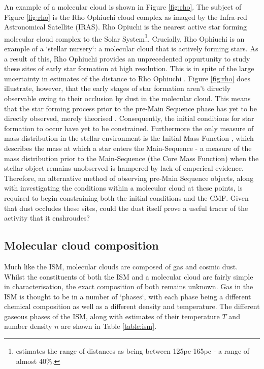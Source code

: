 \documentclass{report}
\begin{document}
An example of a molecular cloud is shown in Figure \ref{fig:rho}. The subject of Figure \ref{fig:rho} is the Rho Ophiuchi cloud complex as imaged by the Infra-red Astronomical Satellite (IRAS). Rho Opiuchi is the nearest active star forming molecular cloud complex to the Solar System\footnote{\textcite{rho-dist} estimates the range of distances as being between 125pc-165pc - a range of almost 40\%.}. Crucially, Rho Ophiuchi is an example of a `stellar nursery`: a molecular cloud that is actively forming stars. As a result of this, Rho Ophiuchi provides an unprecedented oppurtunity to study these sites of early star formation at high resolution. This is in spite of the large uncertainty in estimates of the distance to Rho Ophiuchi \parencite{rho-dist}. Figure \ref{fig:rho} does illustrate, however, that the early stages of star formation aren't directly observable owing to their occlusion by dust in the molecular cloud. This means that the star forming process prior to the pre-Main Sequence phase has yet to be directly observed, merely theorised \parencite{hayashi}. Consequently, the initial conditions for star formation to occur have yet to be constrained. Furthermore the only measure of mass distribution in the stellar environment is the Initial Mass Function \parencite{imf}, which describes the mass at which a star enters the Main-Sequence - a measure of the mass distribution prior to the Main-Sequence (the Core Mass Function) when the stellar object remains unobserved is hampered by lack of emperical evidence. Therefore, an alternative method of observing pre-Main Sequence objects, along with investigating the conditions within a molecular cloud at these points, is required to begin constraining both the initial conditions and the CMF. Given that dust occludes these sites, could the dust itself prove a useful tracer of the activity that it enshroudes?

\subsection{Molecular cloud composition}
Much like the ISM, molecular clouds are composed of gas and cosmic dust. Whilst the constituents of both the ISM and a molecular cloud are fairly simple in characterisation, the exact composition of both remains unknown. Gas in the ISM is thought to be in a number of `phases`, with each phase being a different chemical composition as well as a different density and temperature. The different gaseous phases of the ISM, along with estimates of their temperature $T$ and number density $n$ are shown in Table \ref{table:ism}.
\end{document}
